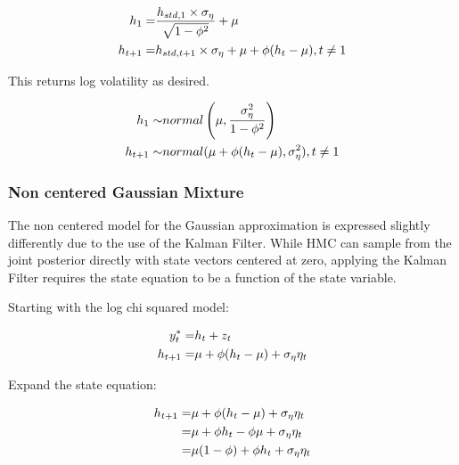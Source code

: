 \documentclass[12pt, a4paper]{article}
\begin{document}
        $$
        \begin{aligned}
        h_1 =& \space \frac{h_{std, 1}\times \sigma_{\eta}} {\sqrt{1 - \phi^2}} + \mu \\
        h_{t+1} =& \space h_{std, t+1}\times \sigma_{\eta} + \mu  + \phi(h_{t} - \mu),\space t\neq 1
        \end{aligned}
        $$
        
        This returns log volatility as desired.
        
        $$
        \begin{aligned}
        h_1 \sim& \space normal \left(\mu, \frac{\sigma_{\eta}^2}{1-\phi^2}\right) \\
        h_{t+1} \sim& \space normal(\mu +\phi(h_t - \mu) , \sigma_{\eta}^2), \space\space t\neq 1\\ 
        \end{aligned}
        $$

        \subsubsection{Non centered Gaussian Mixture}
        The non centered model for the Gaussian approximation is expressed slightly differently due to the use of the Kalman Filter. While HMC can sample from the joint posterior directly with state vectors centered at zero, applying the Kalman Filter requires the state equation to be a function of the state variable. 

        Starting with the log chi squared model:

        $$
        \begin{aligned}
        y^{\ast}_t =& h_t + z_t \\
        h_{t+1} =& \space \mu +\phi(h_t - \mu) + \sigma_{\eta} \eta_t
        \end{aligned}
        $$
        
        Expand the state equation:
        
        $$
        \begin{aligned}
        h_{t+1} =& \space \mu +\phi(h_t - \mu) + \sigma_{\eta} \eta_t  \\
        =& \space \mu + \phi h_t - \phi\mu + \sigma_{\eta} \eta_t  \\
        =& \space \mu (1- \phi) + \phi h_t + \sigma_{\eta} \eta_t  \\
        \end{aligned}
        $$
        
\end{document}
